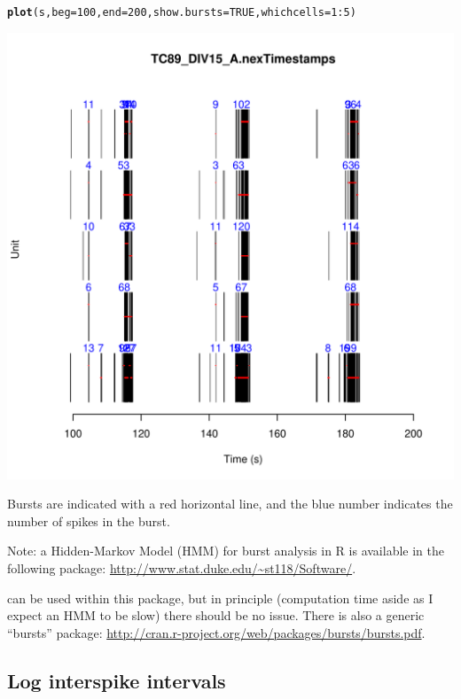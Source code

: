 \documentclass{article}\usepackage[]{graphicx}\usepackage[]{color}
\makeatletter
\def\maxwidth{ %
  \ifdim\Gin@nat@width>\linewidth
    \linewidth
  \else
    \Gin@nat@width
  \fi
}
\newcommand{\hlkwd}[1]{\textcolor[rgb]{0.737,0.353,0.396}{\textbf{#1}}}%
\newenvironment{kframe}{%
 \def\at@end@of@kframe{}%
 \ifinner\ifhmode%
  \def\at@end@of@kframe{\end{minipage}}%
  \begin{minipage}{\columnwidth}%
 \fi\fi%
 \def\FrameCommand##1{\hskip\@totalleftmargin \hskip-\fboxsep
 \colorbox{shadecolor}{##1}\hskip-\fboxsep
     \hskip-\linewidth \hskip-\@totalleftmargin \hskip\columnwidth}%
 \MakeFramed {\advance\hsize-\width
   \@totalleftmargin\z@ \linewidth\hsize
   \@setminipage}}%
 {\par\unskip\endMakeFramed%
 \at@end@of@kframe}
\newenvironment{knitrout}{}{} %
\makeatother
\begin{document}
\begin{knitrout}
\color{fgcolor}\begin{kframe}
\begin{alltt}
\hlkwd{plot}(s, beg = 100, end = 200, show.bursts = TRUE, whichcells = 1:5)
\end{alltt}
\end{kframe}
\includegraphics[width=\maxwidth]{figure/burst-raster} 

\end{knitrout}


Bursts are indicated with a red horizontal line, and the blue number
indicates the number of spikes in the burst.


Note: a Hidden-Markov Model (HMM) for burst analysis in R \citep{Tokdar2010}
is available in the following package:
\url{http://www.stat.duke.edu/~st118/Software/}.

can be used within this package, but in principle (computation time
aside as I expect an HMM to be slow) there should be no issue.  There
is also a generic ``bursts'' package:
\url{http://cran.r-project.org/web/packages/bursts/bursts.pdf}.


\subsection*{Log interspike intervals}
\end{document}
